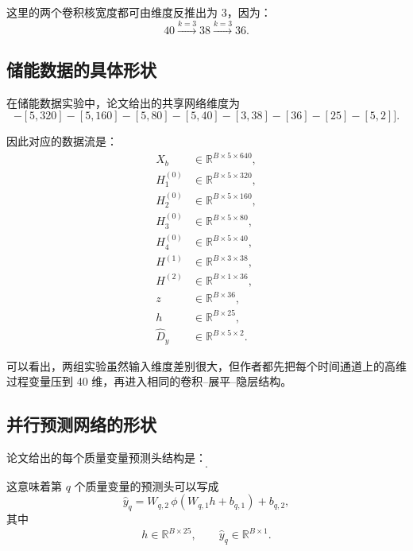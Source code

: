 \documentclass[UTF8]{ctexart}
\begin{document}
这里的两个卷积核宽度都可由维度反推出为 3，因为：
\begin{equation}
    40 \xrightarrow{k=3} 38 \xrightarrow{k=3} 36.
\end{equation}

\subsection{储能数据的具体形状}

在储能数据实验中，论文给出的共享网络维度为
\begin{equation}
    [[5,640]-[5,320]-[5,160]-[5,80]-[5,40]-[3,38]-[36]-[25]-[5,2]].
\end{equation}

因此对应的数据流是：
\begin{align}
    X_b &\in \mathbb{R}^{B \times 5 \times 640}, \\
    H^{(0)}_1 &\in \mathbb{R}^{B \times 5 \times 320}, \\
    H^{(0)}_2 &\in \mathbb{R}^{B \times 5 \times 160}, \\
    H^{(0)}_3 &\in \mathbb{R}^{B \times 5 \times 80}, \\
    H^{(0)}_4 &\in \mathbb{R}^{B \times 5 \times 40}, \\
    H^{(1)} &\in \mathbb{R}^{B \times 3 \times 38}, \\
    H^{(2)} &\in \mathbb{R}^{B \times 1 \times 36}, \\
    z &\in \mathbb{R}^{B \times 36}, \\
    h &\in \mathbb{R}^{B \times 25}, \\
    \hat{D}_y &\in \mathbb{R}^{B \times 5 \times 2}.
\end{align}

可以看出，两组实验虽然输入维度差别很大，但作者都先把每个时间通道上的高维过程变量压到 40 维，再进入相同的卷积--展平--隐层结构。

\subsection{并行预测网络的形状}

论文给出的每个质量变量预测头结构是：
\begin{equation}
    [25-5-1].
\end{equation}

这意味着第 $q$ 个质量变量的预测头可以写成
\begin{equation}
    \hat{y}_q = W_{q,2}\,\phi(W_{q,1} h + b_{q,1}) + b_{q,2},
\end{equation}
其中
\begin{equation}
    h \in \mathbb{R}^{B \times 25},
    \qquad
    \hat{y}_q \in \mathbb{R}^{B \times 1}.
\end{equation}
\end{document}

